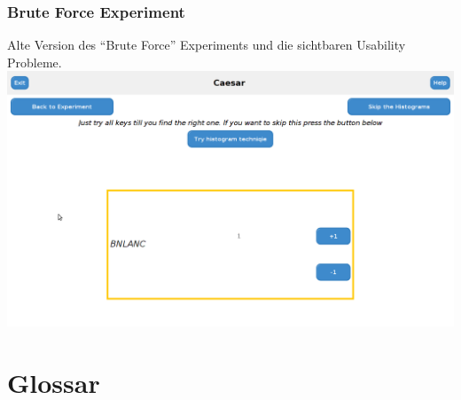 \documentclass{article}
\begin{document}
  \subsubsection{Brute Force Experiment}
    Alte Version des ``Brute Force'' Experiments und die sichtbaren Usability Probleme.\newline
    \includegraphics[width=15cm]{resources/bruteForceUsability.png}

    
\section{Glossar}

 \restoregeometry

\glsaddall
\printglossary[numberedsection, style=altlist]
\end{document}

